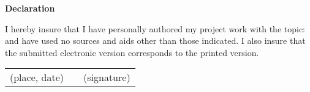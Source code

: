 \clearpage

\thispagestyle{empty}

{\LARGE\textsf{\textbf{Declaration}}\bigskip}



I hereby insure that I have personally authored my project work with the topic: \emph{\themaMeinerArbeit} and have used no sources and aids other than those indicated. I also
insure that the submitted electronic version corresponds to the printed version. 

\vspace{3cm}

\begin{center}
\begin{tabular}{ccc}
(place, date) & \hspace{0.3\linewidth} & (signature)
\end{tabular}
\end{center}